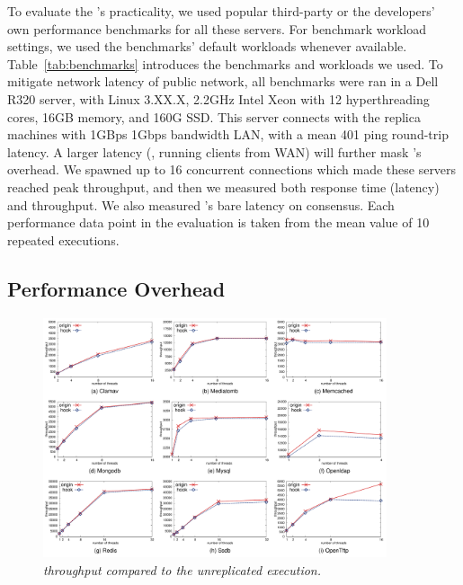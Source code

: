 To evaluate the \xxx's practicality, we used popular third-party or the 
developers' own performance benchmarks for all these servers. For benchmark 
workload settings, we used the benchmarks' default workloads whenever 
available. Table~\ref{tab:benchmarks} introduces the benchmarks and workloads 
we used. To mitigate network latency of public network, all benchmarks were 
ran in a Dell R320 server, with Linux 3.XX.X, 2.2GHz Intel Xeon with 12 
hyperthreading cores, 16GB memory, and 160G SSD. This server connects with the 
replica machines with 1GBps 1Gbps bandwidth LAN, with a mean 401 \us ping 
round-trip latency. A larger latency (\eg, running clients from WAN) will 
further mask \xxx's overhead. We spawned up to 16 concurrent connections 
which made these servers reached peak throughput, and then we measured both 
response time (latency) and throughput. We also measured \xxx's bare 
latency on consensus. Each performance data point in the evaluation is taken 
from the mean value of 10 repeated executions.




\subsection{Performance Overhead} \label{sec:overhead}

\begin{figure}[t]
\centering
\includegraphics[width=0.9\textwidth]{figures/throughput}
\vspace{-.20in}
\caption{\small {\em \xxx throughput compared to the unreplicated 
execution.}}
\label{fig:tput}
\end{figure}


